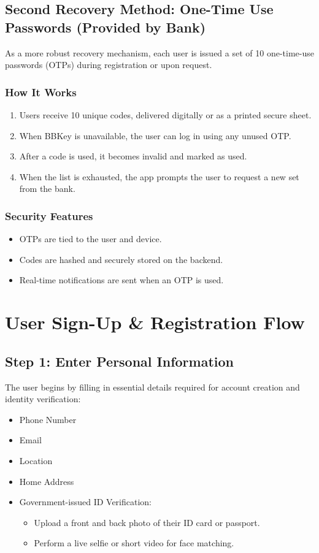 \documentclass[12pt]{article}
\begin{document}
\subsection*{Second Recovery Method: One-Time Use Passwords (Provided by Bank)}
As a more robust recovery mechanism, each user is issued a set of 10 one-time-use passwords (OTPs) during registration or upon request.

\subsubsection*{How It Works}
\begin{enumerate}
    \item Users receive 10 unique codes, delivered digitally or as a printed secure sheet.
    \item When BBKey is unavailable, the user can log in using any unused OTP.
    \item After a code is used, it becomes invalid and marked as used.
    \item When the list is exhausted, the app prompts the user to request a new set from the bank.
\end{enumerate}

\subsubsection*{Security Features}
\begin{itemize}
    \item OTPs are tied to the user and device.
    \item Codes are hashed and securely stored on the backend.
    \item Real-time notifications are sent when an OTP is used.
\end{itemize}

\section*{User Sign-Up \& Registration Flow}

\subsection*{Step 1: Enter Personal Information}
The user begins by filling in essential details required for account creation and identity verification:
\begin{itemize}
    \item Phone Number
    \item Email
    \item Location
    \item Home Address
    \item Government-issued ID Verification:
    \begin{itemize}
        \item Upload a front and back photo of their ID card or passport.
        \item Perform a live selfie or short video for face matching.
    \end{itemize}
\end{itemize}
\end{document}
